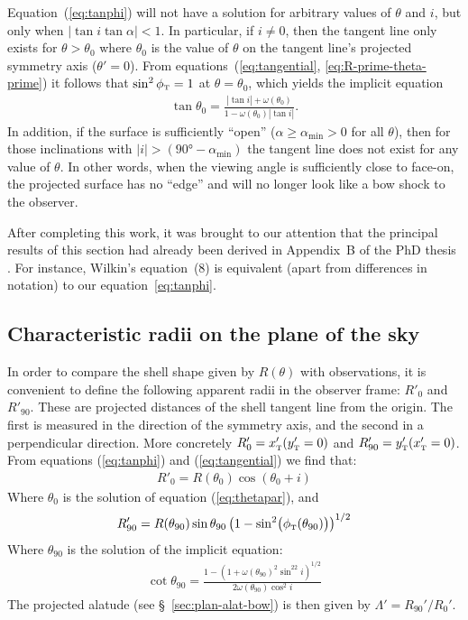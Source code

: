 Equation~(\ref{eq:tanphi}) will not have a solution for
arbitrary values of $\theta$ and $i$, but only when
$|\tan i\tan\alpha|<1$. In particular, if $i\neq 0$, then the tangent line
only exists for \(\theta > \theta_{0}\) where \(\theta_{0}\) is the value of
\(\theta\) on the tangent line's projected symmetry axis
(\(\theta' = 0\)).  From equations~(\ref{eq:tangential},
\ref{eq:R-prime-theta-prime}) it follows that \(\sin^2\phi_{\mathrm{\scriptscriptstyle T}} = 1\) at
\(\theta = \theta_0\), which yields the implicit equation
\begin{align}
\tan\theta_{0} = \frac{|\tan i| + \omega(\theta_{0})}{1-\omega(\theta_{0}) |\tan i|} . 
\label{eq:thetapar}
\end{align}
In addition, if the surface is sufficiently ``open''
(\(\alpha \ge \alpha_{\mathrm{min}} > 0\) for all \(\theta\)), then for those
inclinations with
\(\vert i\vert > (\ang{90} - \alpha_{\mathrm{min}}) \) the tangent line does not exist
for any value of \(\theta\).  In other words, when the viewing angle is
sufficiently close to face-on, the projected surface has no ``edge''
and will no longer look like a bow shock to the observer.

After completing this work, it was brought to our attention that the
principal results of this section had already been derived in
Appendix~B of the PhD thesis \citet{Wilkin:1997a}.  For instance,
Wilkin's equation~(8) is equivalent (apart from differences in
notation) to our equation~\eqref{eq:tanphi}.

\subsection{Characteristic radii on the plane of the sky}

In order to compare the shell shape given by $R(\theta)$ with observations,
it is convenient to define the following apparent radii in the
observer frame: $R'_{0}$ and $R'_{90}$. These are projected distances
of the shell tangent line from the origin. The first is measured in
the direction of the symmetry axis, and the second in a perpendicular
direction. More concretely $R'_{0} = x'_{\mathrm{\scriptscriptstyle T}}(y'_{\mathrm{\scriptscriptstyle T}}=0)$ and
$R'_{90} = y'_{\mathrm{\scriptscriptstyle T}}(x'_{\mathrm{\scriptscriptstyle T}}=0)$. From equations (\ref{eq:tanphi}) and
(\ref{eq:tangential}) we find that:
\begin{align}
R'_{0} = R(\theta_{0})\cos(\theta_{0} + i) \label{eq:Rpar} 
\end{align}
Where $\theta_{0}$ is the solution of equation (\ref{eq:thetapar}), and
\begin{align}
  \label{eq:R90prime}
R'_{90} = R(\theta_{90})\sin\theta_{90}\left(1-\sin^2\bigl(\phi_{\mathrm{\scriptscriptstyle T}}(\theta_{90})\bigr)\right)^{1/2}
\end{align}
Where $\theta_{90}$ is the solution of the implicit equation:
\begin{align}
  \label{eq:th90}
\cot\theta_{90} = \frac{1-\left(1+\omega(\theta_{90})^2\sin^22i\right)^{1/2}}{2\omega(\theta_{90})\cos^2 i}
\end{align}
The projected alatude (see \S~\ref{sec:plan-alat-bow}) is then given
by \(\Lambda' = R_{90}' / R_0'\).

